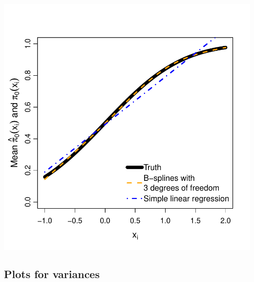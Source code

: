 \documentclass{article}\usepackage[]{graphicx}\usepackage[]{color}
\makeatletter
\def\maxwidth{ %
  \ifdim\Gin@nat@width>\linewidth
    \linewidth
  \else
    \Gin@nat@width
  \fi
}
\newenvironment{knitrout}{}{} %
\makeatother
\begin{document}
\begin{knitrout}
{\centering \includegraphics[width=\maxwidth]{figures/Fig1b-1} 

}



\end{knitrout}

\subsection{Plots for variances}
\end{document}
